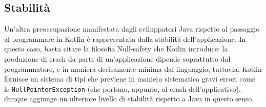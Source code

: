 \subsection{Stabilità}
Un'altra preoccupazione manifestata dagli sviluppatori Java rispetto al passaggio al programmare in Kotlin è rappresentata dalla stabilità dell'applicazione. In questo caso, basta citare la filosofia Null-safety che Kotlin introduce: la produzione di crash da parte di un'applicazione dipende soprattutto dal programmatore, e in maniera decisamente minima dal linguaggio; tuttavia, Kotlin fornisce un sistema di tipi che previene in maniera sistematica gravi errori come le \texttt{NullPointerException} (che portano, appunto, al crash dell'applicativo), dunque aggiunge un ulteriore livello di stabilità rispetto a Java in questo senso.\\
